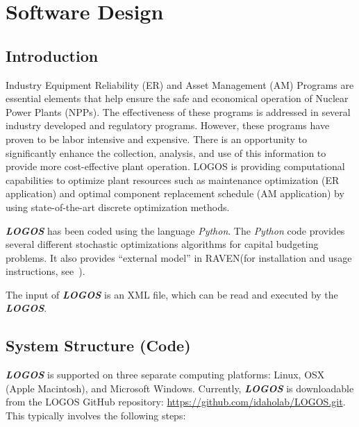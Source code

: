 \section{Software Design}
\subsection{Introduction}
Industry Equipment Reliability (ER) and Asset Management (AM) Programs are
essential elements that help ensure the safe and economical operation of
Nuclear Power Plants (NPPs). The effectiveness of these programs is addressed
in several industry developed and regulatory programs. However, these programs
have proven to be labor intensive and expensive. There is an opportunity to
significantly enhance the collection, analysis, and use of this information to
provide more cost-effective plant operation. LOGOS is providing computational
capabilities to optimize plant resources such as maintenance optimization
(ER application) and optimal component replacement schedule (AM application)
by using state-of-the-art discrete optimization methods.

\textbf{\textit{LOGOS}} has been coded using the language \textit{Python}.
The \textit{Python} code provides several different stochastic optimizations
algorithms for capital budgeting problems. It also provides ``external model''
in RAVEN(for installation and usage instructions, see~\cite{RAVENuserManual}).

The input of  \textit{\textbf{LOGOS}} is an XML file, which can be read and
executed by the  \textit{\textbf{LOGOS}}.

\subsection{System Structure (Code)}

\textbf{\textit{LOGOS}} is supported on three separate computing platforms:
Linux, OSX (Apple Macintosh), and Microsoft Windows. Currently, \textbf{\textit{LOGOS}}
is downloadable from the LOGOS GitHub repository:
\url{https://github.com/idaholab/LOGOS.git}. This typically involves the following steps:

